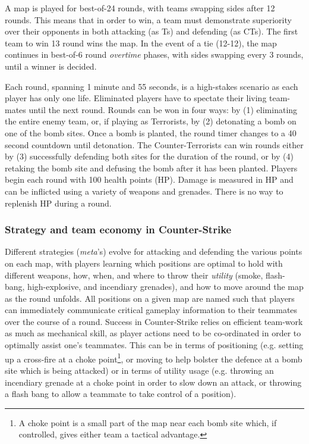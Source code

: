 A map is played for best-of-24 rounds, with teams swapping sides after 12 rounds. This means that in order to win, a team must demonstrate superiority over their opponents in both attacking (as Ts) and defending (as CTs). The first team to win 13 round wins the map. In the event of a tie (12-12), the map continues in best-of-6 round \textit{overtime} phases, with sides swapping every 3 rounds, until a winner is decided.

Each round, spanning 1 minute and 55 seconds, is a high-stakes scenario as each player has only one life. Eliminated players have to spectate their living team-mates until the next round. Rounds can be won in four ways: by (1) eliminating the entire enemy team, or, if playing as Terrorists, by (2) detonating a bomb on one of the bomb sites. Once a bomb is planted, the round timer changes to a 40 second countdown until detonation. The Counter-Terrorists can win rounds either by (3) successfully defending both sites for the duration of the round, or by (4) retaking the bomb site and defusing the bomb after it has been planted. Players begin each round with 100 health points (HP). Damage is measured in HP and can be inflicted using a variety of weapons and grenades. There is no way to replenish HP during a round.

\subsubsection{Strategy and team economy in Counter-Strike}

Different strategies (\textit{meta}'s) evolve for attacking and defending the various points on each map, with players learning which positions are optimal to hold with different weapons, how, when, and where to throw their \textit{utility} (smoke, flash-bang, high-explosive, and incendiary grenades), and how to move around the map as the round unfolds. All positions on a given map are named such that players can immediately communicate critical gameplay information to their teammates over the course of a round. Success in Counter-Strike relies on efficient team-work as much as mechanical skill, as player actions need to be co-ordinated in order to optimally assist one's teammates. This can be in terms of positioning (e.g. setting up a cross-fire at a choke point\footnote{A choke point is a small part of the map near each bomb site which, if controlled, gives either team a tactical advantage.}, or moving to help bolster the defence at a bomb site which is being attacked) or in terms of utility usage (e.g. throwing an incendiary grenade at a choke point in order to slow down an attack, or throwing a flash bang to allow a teammate to take control of a position). 

